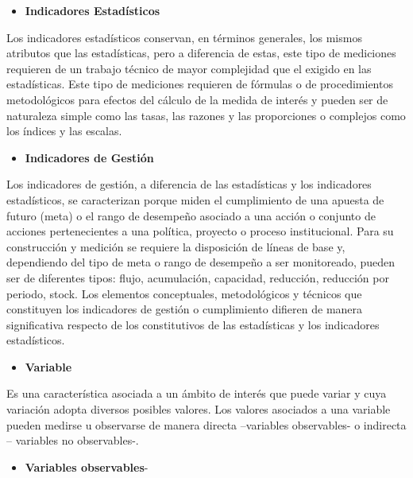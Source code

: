 \documentclass[
]{book}
\providecommand{\tightlist}{%
  \setlength{\itemsep}{0pt}\setlength{\parskip}{0pt}}
\begin{document}
\begin{itemize}
\tightlist
\item
  \textbf{Indicadores Estadísticos}
\end{itemize}

Los indicadores estadísticos conservan, en términos generales, los mismos atributos que las estadísticas, pero a diferencia de estas, este tipo de mediciones requieren de un trabajo técnico de mayor complejidad que el exigido en las estadísticas. Este tipo de mediciones requieren de fórmulas o de procedimientos metodológicos para efectos del cálculo de la medida de interés y pueden ser de naturaleza simple como las tasas, las razones y las proporciones o complejos como los índices y las escalas.

\begin{itemize}
\tightlist
\item
  \textbf{Indicadores de Gestión}
\end{itemize}

Los indicadores de gestión, a diferencia de las estadísticas y los indicadores estadísticos, se caracterizan porque miden el cumplimiento de una apuesta de futuro (meta) o el rango de desempeño asociado a una acción o conjunto de acciones pertenecientes a una política, proyecto o proceso institucional. Para su construcción y medición se requiere la disposición de líneas de base y, dependiendo del tipo de meta o rango de desempeño a ser monitoreado, pueden ser de diferentes tipos: flujo, acumulación, capacidad, reducción, reducción por periodo, stock. Los elementos conceptuales, metodológicos y técnicos que constituyen los indicadores de gestión o cumplimiento difieren de manera significativa respecto de los constitutivos de las estadísticas y los indicadores estadísticos.

\begin{itemize}
\tightlist
\item
  \textbf{Variable}
\end{itemize}

Es una característica asociada a un ámbito de interés que puede variar y cuya variación adopta diversos posibles valores. Los valores asociados a una variable pueden medirse u observarse de manera directa --variables observables- o indirecta -- variables no observables-.

\begin{itemize}
\tightlist
\item
  \textbf{Variables observables}-
\end{itemize}
\end{document}
